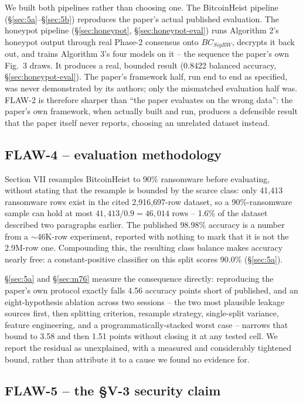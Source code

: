 \documentclass[conference]{IEEEtran}
\begin{document}
We built both pipelines rather than choosing one. The BitcoinHeist pipeline
(\S\ref{sec:5a}--\S\ref{sec:5b}) reproduces the paper's actual published evaluation. The
honeypot pipeline (\S\ref{sec:honeypot}, \S\ref{sec:honeypot-eval}) runs Algorithm 2's honeypot
output through real Phase-2 consensus onto $BC_{SigRW}$, decrypts it back out, and trains
Algorithm 3's four models on it -- the sequence the paper's own Fig.~3 draws. It produces a
real, bounded result (0.8422 balanced accuracy, \S\ref{sec:honeypot-eval}). The paper's
framework half, run end to end as specified, was never demonstrated by its authors; only the
mismatched evaluation half was. FLAW-2 is therefore sharper than ``the paper evaluates on the
wrong data'': the paper's own framework, when actually built and run, produces a defensible
result that the paper itself never reports, choosing an unrelated dataset instead.

\subsection{FLAW-4 -- evaluation methodology}

Section VII resamples BitcoinHeist to 90\% ransomware before evaluating, without stating that the
resample is bounded by the scarce class: only 41{,}413 ransomware rows exist in the cited
2{,}916{,}697-row dataset, so a 90\%-ransomware sample can hold at most
$41{,}413/0.9=46{,}014$ rows -- 1.6\% of the dataset described two paragraphs earlier. The
published 98.98\% accuracy is a number from a $\sim$46K-row experiment, reported with nothing to
mark that it is not the 2.9M-row one. Compounding this, the resulting class balance makes
accuracy nearly free: a constant-positive classifier on this split scores 90.0\%
(\S\ref{sec:5a}).

\S\ref{sec:5a} and \S\ref{sec:m76} measure the consequence directly: reproducing the paper's own
protocol exactly falls 4.56 accuracy points short of published, and an eight-hypothesis ablation
across two sessions -- the two most plausible leakage sources first, then splitting criterion,
resample strategy, single-split variance, feature engineering, and a programmatically-stacked
worst case -- narrows that bound to 3.58 and then 1.51 points without closing it at any tested
cell. We report the residual as unexplained, with a measured and considerably tightened bound,
rather than attribute it to a cause we found no evidence for.

\subsection{FLAW-5 -- the \S V-3 security claim}
\label{sec:flaw5}
\end{document}
